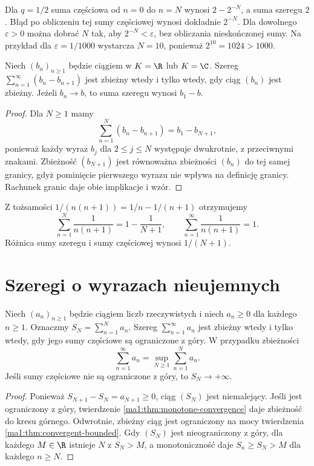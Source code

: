\begin{przyklad}
Dla $q=1/2$ suma częściowa od $n=0$ do $n=N$ wynosi $2-2^{-N}$, a suma szeregu $2$. Błąd po obliczeniu tej sumy częściowej wynosi dokładnie $2^{-N}$. Dla dowolnego $\varepsilon>0$ można dobrać $N$ tak, aby $2^{-N}<\varepsilon$, bez obliczania nieskończonej sumy. Na przykład dla $\varepsilon=1/1000$ wystarcza $N=10$, ponieważ $2^{10}=1024>1000$.
\end{przyklad}

\begin{twierdzenie}
\label{ma1:thm:telescoping-series}
Niech $(b_n)_{n\ge1}$ będzie ciągiem w $K=\R$ lub $K=\C$. Szereg $\sum_{n=1}^\infty(b_n-b_{n+1})$ jest zbieżny wtedy i tylko wtedy, gdy ciąg $(b_n)$ jest zbieżny. Jeżeli $b_n\to b$, to suma szeregu wynosi $b_1-b$.
\end{twierdzenie}
\begin{proof}
Dla $N\ge1$ mamy
\[
 \sum_{n=1}^N(b_n-b_{n+1})=b_1-b_{N+1},
\]
ponieważ każdy wyraz $b_j$ dla $2\le j\le N$ występuje dwukrotnie, z przeciwnymi znakami. Zbieżność $(b_{N+1})$ jest równoważna zbieżności $(b_n)$ do tej samej granicy, gdyż pominięcie pierwszego wyrazu nie wpływa na definicję granicy. Rachunek granic daje obie implikacje i wzór.
\end{proof}

\begin{przyklad}
\label{ma1:ex:telescoping-series}
Z tożsamości $1/(n(n+1))=1/n-1/(n+1)$ otrzymujemy
\[
 \sum_{n=1}^N\frac1{n(n+1)}=1-\frac1{N+1},
 \qquad \sum_{n=1}^\infty\frac1{n(n+1)}=1.
\]
Różnica sumy szeregu i sumy częściowej wynosi $1/(N+1)$.
\end{przyklad}

\section{Szeregi o wyrazach nieujemnych}
\begin{twierdzenie}
\label{ma1:thm:positive-series}
Niech $(a_n)_{n\ge1}$ będzie ciągiem liczb rzeczywistych i niech $a_n\ge0$ dla każdego $n\ge1$. Oznaczmy $S_N=\sum_{n=1}^N a_n$. Szereg $\sum_{n=1}^\infty a_n$ jest zbieżny wtedy i tylko wtedy, gdy jego sumy częściowe są ograniczone z góry. W przypadku zbieżności
\[
 \sum_{n=1}^\infty a_n=\sup_{N\ge1}\sum_{n=1}^N a_n.
\]
Jeśli sumy częściowe nie są ograniczone z góry, to $S_N\to+\infty$.
\end{twierdzenie}
\begin{proof}
Ponieważ $S_{N+1}-S_N=a_{N+1}\ge0$, ciąg $(S_N)$ jest niemalejący. Jeśli jest ograniczony z góry, twierdzenie \ref{ma1:thm:monotone-convergence} daje zbieżność do kresu górnego. Odwrotnie, zbieżny ciąg jest ograniczony na mocy twierdzenia \ref{ma1:thm:convergent-bounded}. Gdy $(S_N)$ jest nieograniczony z góry, dla każdego $M\in\R$ istnieje $N$ z $S_N>M$, a monotoniczność daje $S_n\ge S_N>M$ dla każdego $n\ge N$.
\end{proof}

